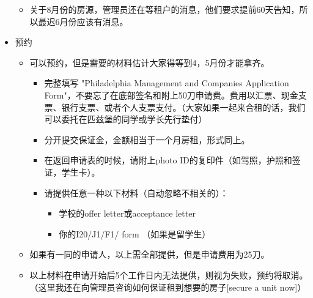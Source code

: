 \documentclass[nofonts,a4paper,11pt]{article}
\begin{document}
\begin{itemize}
\begin{itemize}
\begin{tabular}{|c|c|c|c|c|}
			\hline
		\end{tabular}
		\item 关于8月份的房源，管理员还在等租户的消息，他们要求提前60天告知，所以最迟6月份应该有消息。
	\end{itemize}
	\item 预约
	\begin{itemize}
		\item 可以预约，但是需要的材料估计大家得等到4，5月份才能拿齐。
		\begin{itemize}
			\item 完整填写 "Philadelphia Management and Companies Application Form"，不要忘了在底部签名和附上50刀申请费。费用以汇票、现金支票、银行支票、或者个人支票支付。（大家如果一起来合租的话，我们可以委托在匹兹堡的同学或学长先行垫付）
			\item 分开提交保证金，金额相当于一个月房租，形式同上。
			\item 在返回申请表的时候，请附上photo ID的复印件（如驾照，护照和签证，学生卡）。
			\item 请提供任意一种以下材料（自动忽略不相关的）：
			\begin{itemize}
				\item 学校的offer letter或acceptance letter
				\item 你的I20/J1/F1/ form （如果是留学生）
			\end{itemize}			
		\end{itemize}
		\item 如果有一同的申请人，以上需全部提供，但是申请费用为25刀。
		\item 以上材料在申请开始后5个工作日内无法提供，则视为失败，预约将取消。（这里我还在向管理员咨询如何保证租到想要的房子[secure a unit now]）
	\end{itemize}
\end{itemize}
\end{document}

